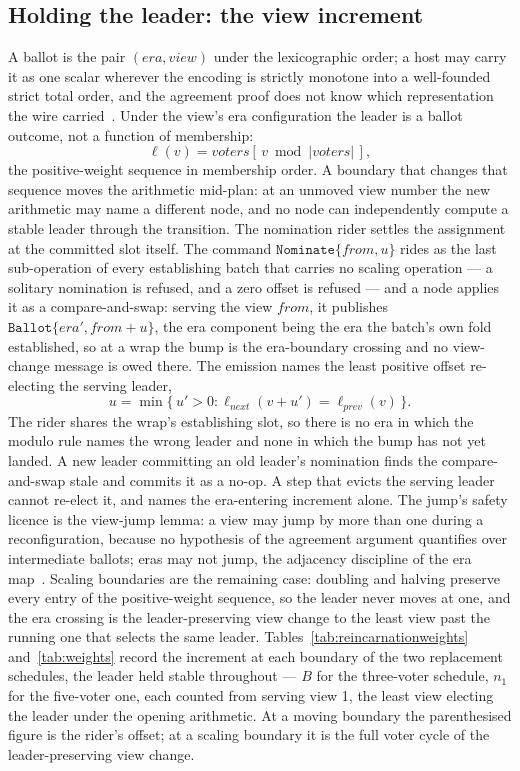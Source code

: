 \documentclass[10pt,journal,letterpaper]{IEEEtran}
\newcommand{\code}[1]{\texttt{#1}}
\begin{document}
\subsection{Holding the leader: the view increment}
A ballot is the pair $(\mathit{era}, \mathit{view})$ under the lexicographic order; a host may carry it as one scalar wherever the encoding is strictly monotone into a well-founded strict total order, and the agreement proof does not know which representation the wire carried~\cite{artifact}. Under the view's era configuration the leader is a ballot outcome, not a function of membership:
\begin{equation*}
\ell(v) = \mathit{voters}[\,v \bmod |\mathit{voters}|\,],
\end{equation*}
the positive-weight sequence in membership order. A boundary that changes that sequence moves the arithmetic mid-plan: at an unmoved view number the new arithmetic may name a different node, and no node can independently compute a stable leader through the transition. The nomination rider settles the assignment at the committed slot itself. The command $\code{Nominate}\{\mathit{from}, u\}$ rides as the last sub-operation of every establishing batch that carries no scaling operation --- a solitary nomination is refused, and a zero offset is refused --- and a node applies it as a compare-and-swap: serving the view $\mathit{from}$, it publishes $\code{Ballot}\{\mathit{era}', \mathit{from} + u\}$, the era component being the era the batch's own fold established, so at a wrap the bump is the era-boundary crossing and no view-change message is owed there. The emission names the least positive offset re-electing the serving leader,
\begin{equation*}
u = \min\{\,u' > 0 : \ell_{\mathit{next}}(v + u') = \ell_{\mathit{prev}}(v)\,\}.
\end{equation*}
The rider shares the wrap's establishing slot, so there is no era in which the modulo rule names the wrong leader and none in which the bump has not yet landed. A new leader committing an old leader's nomination finds the compare-and-swap stale and commits it as a no-op. A step that evicts the serving leader cannot re-elect it, and names the era-entering increment alone. The jump's safety licence is the view-jump lemma: a view may jump by more than one during a reconfiguration, because no hypothesis of the agreement argument quantifies over intermediate ballots; eras may not jump, the adjacency discipline of the era map~\cite{artifact}. Scaling boundaries are the remaining case: doubling and halving preserve every entry of the positive-weight sequence, so the leader never moves at one, and the era crossing is the leader-preserving view change to the least view past the running one that selects the same leader. Tables~\ref{tab:reincarnationweights} and~\ref{tab:weights} record the increment at each boundary of the two replacement schedules, the leader held stable throughout --- $B$ for the three-voter schedule, $n_1$ for the five-voter one, each counted from serving view 1, the least view electing the leader under the opening arithmetic. At a moving boundary the parenthesised figure is the rider's offset; at a scaling boundary it is the full voter cycle of the leader-preserving view change.
\end{document}
